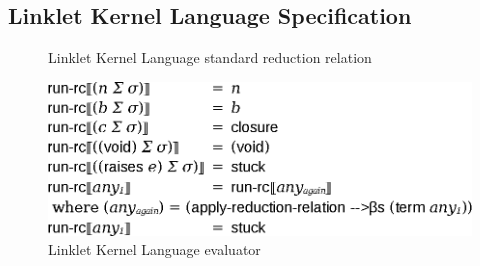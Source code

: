 \begin{appendices}



\chapter[\texorpdfstring{Linklet Kernel Language Specification}{Appendix A}]{Linklet Kernel Language Specification}
\label{appendix:linklet-kernel-language}


    \begin{figure}[h]
    \centering
    \caption{Linklet Kernel Language standard reduction relation}
    \label{fig:rc-red-relation}
    \end{figure}

    \begin{figure}[h]
    \centering
    \includegraphics[scale=1]{sections/figures/rc-run-rc.eps}
    \caption{Linklet Kernel Language evaluator}
    \label{fig:rc-run-rc}
    \end{figure}



\end{appendices}
